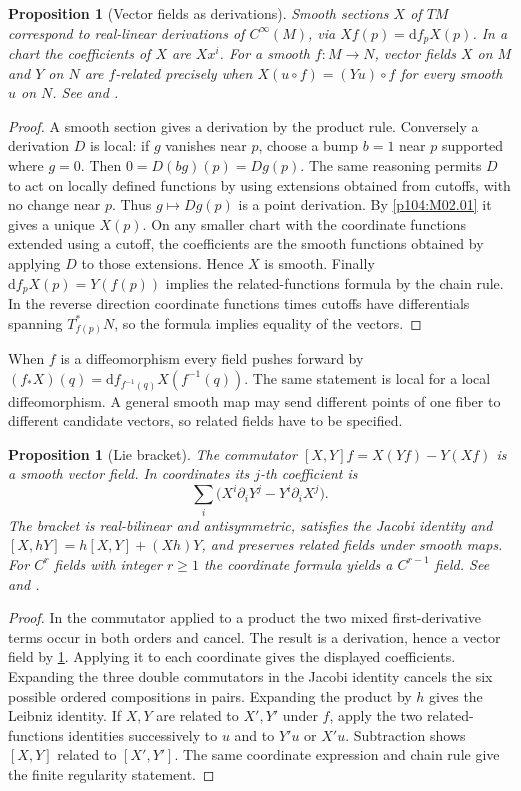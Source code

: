 \documentclass[11pt,oneside,openany]{book}
\newtheorem{proposition}[theorem]{Proposition}
\theoremstyle{definition}
\theoremstyle{remark}
\newcommand{\dd}{\mathrm d}
\begin{document}
\begin{proposition}[Vector fields as derivations]\label{p104:M06.01}
Smooth sections \(X\) of \(TM\) correspond to real-linear derivations of \(C^\infty(M)\), via \(Xf(p)=\dd f_pX(p)\). In a chart the coefficients of \(X\) are \(Xx^i\). For a smooth \(f:M\to N\), vector fields \(X\) on \(M\) and \(Y\) on \(N\) are \(f\)-related precisely when \(X(u\circ f)=(Yu)\circ f\) for every smooth \(u\) on \(N\). See \cite[pp.\ 174--185]{lee} and \cite[\S14]{tu}.
\end{proposition}
\begin{proof}
A smooth section gives a derivation by the product rule. Conversely a derivation \(D\) is local: if \(g\) vanishes near \(p\), choose a bump \(b=1\) near \(p\) supported where \(g=0\). Then \(0=D(bg)(p)=Dg(p)\). The same reasoning permits \(D\) to act on locally defined functions by using extensions obtained from cutoffs, with no change near \(p\). Thus \(g\mapsto Dg(p)\) is a point derivation. By \cref{p104:M02.01} it gives a unique \(X(p)\). On any smaller chart with the coordinate functions extended using a cutoff, the coefficients are the smooth functions obtained by applying \(D\) to those extensions. Hence \(X\) is smooth. Finally \(\dd f_pX(p)=Y(f(p))\) implies the related-functions formula by the chain rule. In the reverse direction coordinate functions times cutoffs have differentials spanning \(T^*_{f(p)}N\), so the formula implies equality of the vectors.
\end{proof}

When \(f\) is a diffeomorphism every field pushes forward by \((f_*X)(q)=\dd f_{f^{-1}(q)}X(f^{-1}(q))\). The same statement is local for a local diffeomorphism. A general smooth map may send different points of one fiber to different candidate vectors, so related fields have to be specified.

\begin{proposition}[Lie bracket]\label{p104:M06.02}
The commutator \([X,Y]f=X(Yf)-Y(Xf)\) is a smooth vector field. In coordinates its \(j\)-th coefficient is
\[
 \sum_i\bigl(X^i\partial_iY^j-Y^i\partial_iX^j\bigr).
\]
The bracket is real-bilinear and antisymmetric, satisfies the Jacobi identity and \([X,hY]=h[X,Y]+(Xh)Y\), and preserves related fields under smooth maps. For \(C^r\) fields with integer \(r\geq1\) the coordinate formula yields a \(C^{r-1}\) field. See \cite[pp.\ 185--199]{lee} and \cite[\S14.4]{tu}.
\end{proposition}
\begin{proof}
In the commutator applied to a product the two mixed first-derivative terms occur in both orders and cancel. The result is a derivation, hence a vector field by \cref{p104:M06.01}. Applying it to each coordinate gives the displayed coefficients. Expanding the three double commutators in the Jacobi identity cancels the six possible ordered compositions in pairs. Expanding the product by \(h\) gives the Leibniz identity. If \(X,Y\) are related to \(X',Y'\) under \(f\), apply the two related-functions identities successively to \(u\) and to \(Y'u\) or \(X'u\). Subtraction shows \([X,Y]\) related to \([X',Y']\). The same coordinate expression and chain rule give the finite regularity statement.
\end{proof}
\end{document}
